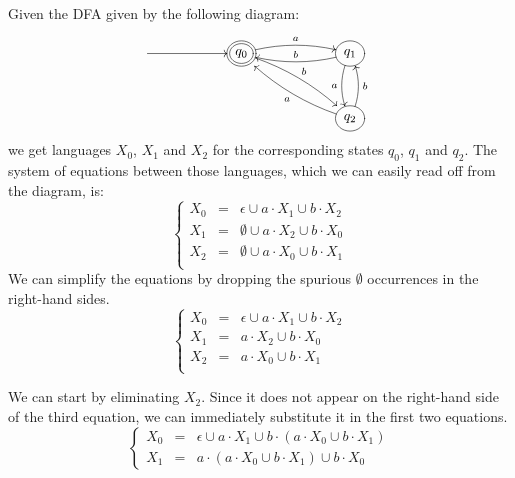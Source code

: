 \begin{example}
Given the DFA given by the following diagram:
\begin{equation*}
\atm\xymatrix @R=1cm @C=2cm {
*{}  \ar[r] & \accept{q_0}  \ar@/^/^a[r] \ar@/^/^b[rd] & q_1 \ar@/^/_b[l] \ar@/_/_a[d] \\
*{}         & *{}                                         & q_2 \ar@/^/^a[ul] \ar@/_/_b[u] \\
}
\end{equation*}
we get languages $X_0$, $X_1$ and $X_2$ for the corresponding states $q_0$, $q_1$ and $q_2$.
The system of equations between those languages, which we can easily read off from the diagram, is:
\begin{equation*}
\left\{
\begin{array}{rcl}
X_0 & = & \epsilon  \cup a \cdot X_1 \cup b \cdot X_2\\
X_1 & = & \emptyset \cup a \cdot X_2 \cup b \cdot X_0\\
X_2 & = & \emptyset \cup a \cdot X_0 \cup b \cdot X_1\\
\end{array}
\right.
\end{equation*}
We can simplify the equations by dropping the spurious $\emptyset$ occurrences in the right-hand sides.
\begin{equation*}
\left\{
\begin{array}{rcl}
X_0 & = & \epsilon  \cup a \cdot X_1 \cup b \cdot X_2\\
X_1 & = & a \cdot X_2 \cup b \cdot X_0\\
X_2 & = & a \cdot X_0 \cup b \cdot X_1\\
\end{array}
\right.
\end{equation*}

We can start by eliminating $X_2$. Since it does not
appear on the right-hand side of the third equation, we can immediately substitute
it in the first two equations.
\begin{equation*}
\left\{
\begin{array}{rcl}
X_0 & = & \epsilon \cup a \cdot X_1 \cup b \cdot (a \cdot X_0 \cup b \cdot X_1)\\
X_1 & = & a \cdot (a \cdot X_0 \cup b \cdot X_1) \cup b \cdot X_0
\end{array}
\right.
\end{equation*}


\end{example}
